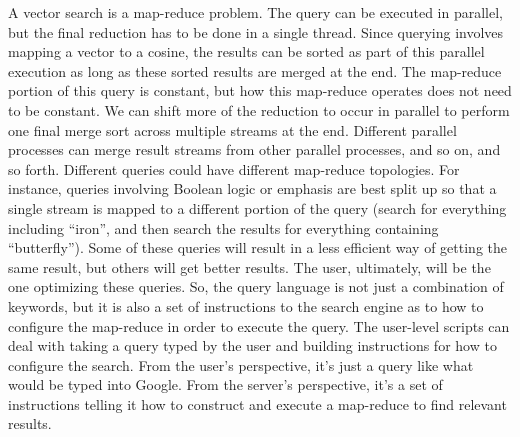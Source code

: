 A vector search is a map-reduce problem.  The query can be executed in parallel,
but the final reduction has to be done in a single thread.  Since querying
involves mapping a vector to a cosine, the results can be sorted as part of this
parallel execution as long as these sorted results are merged at the end.  The
map-reduce portion of this query is constant, but how this map-reduce operates
does not need to be constant.  We can shift more of the reduction to occur in
parallel to perform one final merge sort across multiple streams at the end.
Different parallel processes can merge result streams from other parallel
processes, and so on, and so forth.  Different queries could have different
map-reduce topologies.  For instance, queries involving Boolean logic or
emphasis are best split up so that a single stream is mapped to a different
portion of the query (search for everything including ``iron'', and then search
the results for everything containing ``butterfly'').  Some of these queries
will result in a less efficient way of getting the same result, but others will
get better results.  The user, ultimately, will be the one optimizing these
queries.  So, the query language is not just a combination of keywords, but it
is also a set of instructions to the search engine as to how to configure the
map-reduce in order to execute the query.  The user-level scripts can deal with
taking a query typed by the user and building instructions for how to configure
the search.  From the user's perspective, it's just a query like what would be
typed into Google.  From the server's perspective, it's a set of instructions
telling it how to construct and execute a map-reduce to find relevant results.

